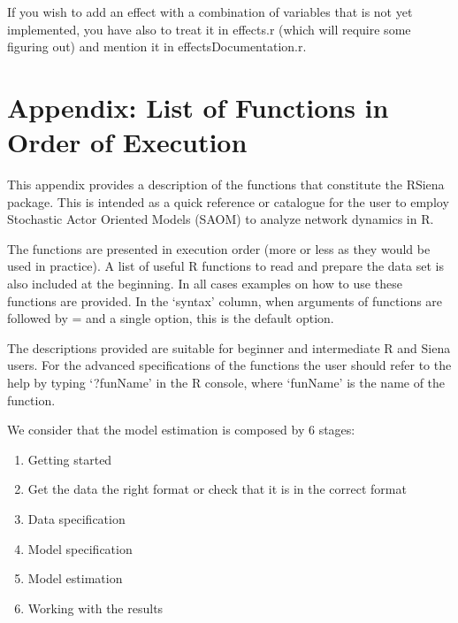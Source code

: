\documentclass[a4paper,fleqn,11pt]{article}
\newcommand{\+}{\, + \,}
\newcommand{\sfn}[1]{\textsf{#1}}
\newcommand{\R}{{\sf R }}
\newcommand{\Rn}{{\sf R}}
\newcommand{\RS}{{\sf \textsf{RSiena} }}
\begin{document}
If you wish to add an effect with a combination of variables that is not yet implemented,
you have also to treat it in \sfn{effects.r} (which will require some figuring out) and
mention it in \sfn{effectsDocumentation.r}.


\appendix
\newpage
\section{Appendix: List of Functions in Order of Execution}

    This appendix
    provides a description of the functions that constitute the
    \RS package. This is intended as a quick reference or catalogue for the
    user to employ Stochastic Actor Oriented Models (SAOM) to analyze network
    dynamics in \Rn.

    The functions are presented in execution order (more or less as
    they would be used in practice). A list of useful \R
    functions to read and prepare the data set is also included at the
    beginning. In all cases examples on how to use these functions are provided.
    In the `syntax' column,
    when arguments of functions are followed by = and a single option,
    this is the default option.

    The descriptions provided are suitable for beginner and intermediate \R and
    Siena users. For the advanced specifications of the functions the user
    should refer to the help by typing `?funName' in the \R console, where
    `funName' is the name of the function.

    We consider that the model estimation is composed by 6 stages:
\begin{enumerate}
    \item Getting started
    \item Get the data the right format or check that it is in the correct
      format
    \item Data specification
    \item Model specification
    \item   Model estimation
    \item   Working with the results
\end{enumerate}
\end{document}
